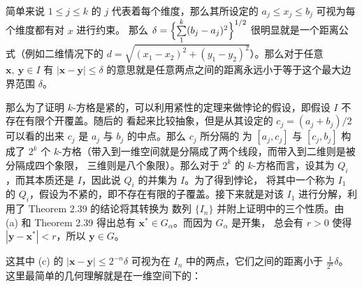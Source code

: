 \documentclass[../poma-notes.tex]{subfiles}
\begin{document}
\begin{anote}
  简单来说 $1 \le j \le k$ 的 $j$ 代表着每个维度，那么其所设定的 $a_j \le x_j \le b_j$ 可视为每个维度都有对 $x$ 进行约束。
  那么 $\delta = \Bigl\{\sum\limits_1^k(b_j-a_j)^2\Bigr\}^{1/2}$ 很明显就是一个距离公式（例如二维情况下的
  $d = \sqrt{(x_1-x_2)^2 + (y_1-y_2)^2}$）。那么对于任意 $\mathbf{x},\ \mathbf{y}\in I$ 有 $|\mathbf{x}-\mathbf{y}|\le\delta$
  的意思就是任意两点之间的距离永远小于等于这个最大边界范围 $\delta$。

  那么为了证明 $k$-方格是紧的，可以利用紧性的定理来做悖论的假设，即假设 $I$ 不存在有限个开覆盖。随后的
  看起来比较抽象，但是从其设定的 $c_j=(a_j + b_j)/2$ 可以看的出来 $c_j$ 是 $a_j$ 与 $b_j$ 的中点。那么 $c_j$ 所分隔的 为
  $[a_j,c_j]$ 与 $[c_j,b_j]$ 构成了 $2^k$ 个 $k$-方格（带入到一维空间就是分隔成了两个线段，而带入到二维则是被分隔成四个象限，
  三维则是八个象限）。那么对于 $2^k$ 的 $k$-方格而言，设其为 $Q_i$，而其本质还是 $I$，因此说 $Q_i$ 的并集为 $I$。为了得到悖论，
  将其中一个称为 $I_1$ 的 $Q_i$，假设为不紧的，即不存在有限的子覆盖。接下来就是对该 $I_1$ 进行分解，利用了 Theorem 2.39 的结论将其转换为
  数列 $\{I_n\}$ 并附上证明中的三个性质。由 (a) 和 Theorem 2.39 得出总有 $\mathbf{x^*} \in G_{\alpha}$。而因为 $G_{\alpha}$ 是开集，
  总会有 $r>0$ 使得 $|\mathbf{y}-\mathbf{x}^*|<r$，所以 $\mathbf{y} \in G$。

  这其中 (c) 的 $|\mathbf{x}-\mathbf{y}|\le2^{-n}\delta$ 可视为在 $I_n$ 中的两点，它们之间的距离小于 $\frac{1}{2^n} \delta$。
  这里最简单的几何理解就是在一维空间下的：
  \begin{center}
\end{center}
\end{anote}
\end{document}
